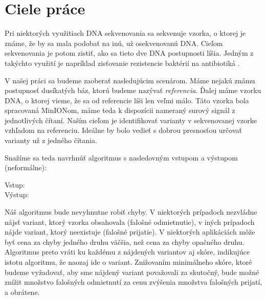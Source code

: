 \chapter{Ciele práce}

\label{kap:ciele}

Pri niektorých využitiach DNA sekvenovania sa sekvenuje vzorka, o ktorej je známe, že by
sa mala podobať na inú, už osekvenovanú DNA. 
Cieľom sekvenovania je potom zistiť, ako sa tieto dve DNA postupnosti líšia. Jedným z takýchto využití 
je napríklad zisťovanie rezistencie baktérií na antibiotiká \cite{Bradley2015}.

V našej práci sa budeme zaoberať nasledujúcim scenárom. Máme nejakú známu postupnosť
dusíkatých báz, ktorú budeme nazývať \emph{referencia}. Ďalej máme vzorku DNA, o ktorej vieme,
že sa od referencie líši len veľmi málo. Táto vzorka bola spracovaná MinIONom, máme teda k dispozícii
nameraný surový signál z jednotlivých čítaní. Naším cieľom je identifikovať varianty v sekvenovanej
vzorke vzhľadom na referenciu. Ideálne by bolo vedieť s dobrou presnosťou určovať varianty už z jedného čítania.

Snažíme sa teda navrhnúť algoritmus s nasledovným vstupom a výstupom (neformálne):

\begin{description}

\item[Vstup:] 

\item[Výstup:] 
\end{description}

Náš algoritmus bude nevyhnutne robiť chyby. V niektorých prípadoch nezvládne nájsť variant, ktorý vzorka
obsahovala (falošné odmietnutie), v iných prípadoch nájde variant, ktorý neexistuje (falošné prijatie). 
V niektorých aplikáciách môže byť cena za chyby jedného druhu väčšia, než cena za chyby opačného 
druhu. Algoritmus preto vráti ku každému z nájdených variantov aj skóre, indikujúce istotu algoritmu, že 
naozaj ide o variant. Znižovaním minimálneho skóre, ktoré budeme vyžadovať, aby sme nájdený variant 
považovali za skutočný, bude možné znížit množstvo falošných odmietnutí za cenu zvýšenia množstva 
falošných prijatí, a obrátene.

